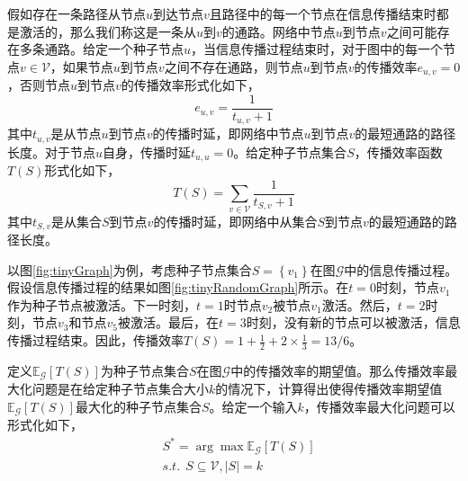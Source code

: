 \begin{mydef}[传播效率]\label{def:ie}
假如存在一条路径从节点$u$到达节点$v$且路径中的每一个节点在信息传播结束时都是激活的，那么我们称这是一条从$u$到$v$的通路。网络中节点$u$到节点$v$之间可能存在多条通路。给定一个种子节点$u$，当信息传播过程结束时，对于图中的每一个节点$v \in \mathcal{V}$，如果节点$u$到节点$v$之间不存在通路，则节点$u$到节点$v$的传播效率$e_{u,v}=0$，否则节点$u$到节点$v$的传播效率形式化如下，
\begin{equation}\label{eq:efficiency}
    e_{u,v} = \frac{1}{t_{u,v}+1}
\end{equation}
其中$t_{u,v}$是从节点$u$到节点$v$的传播时延，即网络中节点$u$到节点$v$的最短通路的路径长度。对于节点$u$自身，传播时延$t_{u,u}=0$。给定种子节点集合$S$，传播效率函数$T\left(S\right)$形式化如下，
\begin{equation}\label{eq:influenceEfficiency}
    T\left(S\right)=\sum\limits_{v\in\mathcal{V}}{\frac{1}{t_{S,v}+1}}
\end{equation}
其中$t_{S,v}$是从集合$S$到节点$v$的传播时延，即网络中从集合$S$到节点$v$的最短通路的路径长度。
\end{mydef}

以图\ref{fig:tinyGraph}为例，考虑种子节点集合$S=\left\{v_1\right\}$在图$\mathcal{G}$中的信息传播过程。假设信息传播过程的结果如图\ref{fig:tinyRandomGraph}所示。在$t=0$时刻，节点$v_1$作为种子节点被激活。下一时刻，$t=1$时节点$v_2$被节点$v_1$激活。然后，$t=2$时刻，节点$v_3$和节点$v_5$被激活。最后，在$t=3$时刻，没有新的节点可以被激活，信息传播过程结束。因此，传播效率$T\left(S\right)=1+\frac{1}{2}+2\times\frac{1}{3}=13/6$。

定义$\mathbb{E}_\mathcal{G}\left[T\left(S\right)\right]$为种子节点集合$S$在图$\mathcal{G}$中的传播效率的期望值。那么传播效率最大化问题是在给定种子节点集合大小$k$的情况下，计算得出使得传播效率期望值$\mathbb{E}_\mathcal{G}\left[T\left(S\right)\right]$最大化的种子节点集合$S$。给定一个输入$k$，传播效率最大化问题可以形式化如下，
\begin{equation}\label{iem:Problem}
    \begin{split}
        &S^{\ast} = \arg\max{\mathbb{E}_\mathcal{G}\left[T\left(S\right)\right]}\\
        &s.t.~~S \subseteq \mathcal{V},\left\vert{S}\right\vert = k
    \end{split}
\end{equation}

